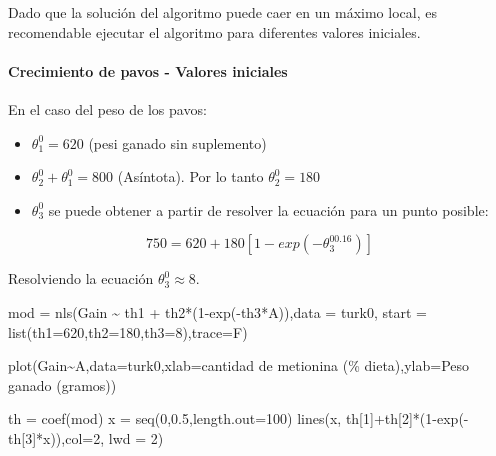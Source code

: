 \documentclass[
]{article}
\newenvironment{Shaded}{\begin{snugshade}}{\end{snugshade}}
\newcommand{\AttributeTok}[1]{\textcolor[rgb]{0.77,0.63,0.00}{#1}}
\newcommand{\DecValTok}[1]{\textcolor[rgb]{0.00,0.00,0.81}{#1}}
\newcommand{\FloatTok}[1]{\textcolor[rgb]{0.00,0.00,0.81}{#1}}
\newcommand{\FunctionTok}[1]{\textcolor[rgb]{0.00,0.00,0.00}{#1}}
\newcommand{\NormalTok}[1]{#1}
\newcommand{\OtherTok}[1]{\textcolor[rgb]{0.56,0.35,0.01}{#1}}
\newcommand{\SpecialCharTok}[1]{\textcolor[rgb]{0.00,0.00,0.00}{#1}}
\newcommand{\StringTok}[1]{\textcolor[rgb]{0.31,0.60,0.02}{#1}}
\begin{document}
Dado que la solución del algoritmo puede caer en un máximo local, es recomendable ejecutar el algoritmo para diferentes valores iniciales.

\hypertarget{crecimiento-de-pavos---valores-iniciales}{%
\paragraph{Crecimiento de pavos - Valores iniciales}\label{crecimiento-de-pavos---valores-iniciales}}

En el caso del peso de los pavos:

\begin{itemize}
\item
  \(\theta_{1}^0=620\) (pesi ganado sin suplemento)
\item
  \(\theta_{2}^0+\theta_{1}^0=800\) (Asíntota). Por lo tanto \(\theta_{2}^0=180\)
\item
  \(\theta_{3}^0\) se puede obtener a partir de resolver la ecuación para un punto posible:
\end{itemize}

\[
750=620+180[1-exp(-\theta_{3}^00.16)]
\]

Resolviendo la ecuación \(\theta_{3}^0\approx8\).

\begin{Shaded}
\begin{Highlighting}[]
\NormalTok{mod }\OtherTok{=} \FunctionTok{nls}\NormalTok{(Gain }\SpecialCharTok{\textasciitilde{}}\NormalTok{ th1 }\SpecialCharTok{+}\NormalTok{ th2}\SpecialCharTok{*}\NormalTok{(}\DecValTok{1}\SpecialCharTok{{-}}\FunctionTok{exp}\NormalTok{(}\SpecialCharTok{{-}}\NormalTok{th3}\SpecialCharTok{*}\NormalTok{A)),}\AttributeTok{data =}\NormalTok{ turk0,}
          \AttributeTok{start =} \FunctionTok{list}\NormalTok{(}\AttributeTok{th1=}\DecValTok{620}\NormalTok{,}\AttributeTok{th2=}\DecValTok{180}\NormalTok{,}\AttributeTok{th3=}\DecValTok{8}\NormalTok{),}\AttributeTok{trace=}\NormalTok{F)}

\FunctionTok{plot}\NormalTok{(Gain}\SpecialCharTok{\textasciitilde{}}\NormalTok{A,}\AttributeTok{data=}\NormalTok{turk0,}\AttributeTok{xlab=}\StringTok{\textquotesingle{}cantidad de metionina (\% dieta)\textquotesingle{}}\NormalTok{,}\AttributeTok{ylab=}\StringTok{\textquotesingle{}Peso ganado (gramos)\textquotesingle{}}\NormalTok{)}

\NormalTok{th }\OtherTok{=} \FunctionTok{coef}\NormalTok{(mod)}
\NormalTok{x }\OtherTok{=} \FunctionTok{seq}\NormalTok{(}\DecValTok{0}\NormalTok{,}\FloatTok{0.5}\NormalTok{,}\AttributeTok{length.out=}\DecValTok{100}\NormalTok{)}
\FunctionTok{lines}\NormalTok{(x, th[}\DecValTok{1}\NormalTok{]}\SpecialCharTok{+}\NormalTok{th[}\DecValTok{2}\NormalTok{]}\SpecialCharTok{*}\NormalTok{(}\DecValTok{1}\SpecialCharTok{{-}}\FunctionTok{exp}\NormalTok{(}\SpecialCharTok{{-}}\NormalTok{th[}\DecValTok{3}\NormalTok{]}\SpecialCharTok{*}\NormalTok{x)),}\AttributeTok{col=}\DecValTok{2}\NormalTok{, }\AttributeTok{lwd =} \DecValTok{2}\NormalTok{)}
\end{Highlighting}
\end{Shaded}
\end{document}
